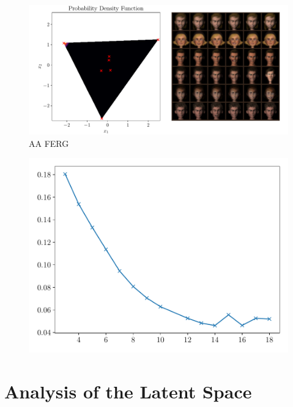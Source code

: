 \begin{figure}[htpb]
    \centering
    \includegraphics[width=1\linewidth]{figures/samples/aa_ferg3.pdf}
    \caption{AA FERG}%
    \label{fig:aa_ferg}
\end{figure}

\begin{figure}[htpb]
    \centering
    \includegraphics[width=0.8\linewidth]{figures/samples/emnist_aa_mse_na.pdf}
    \caption{}%
    \label{fig:emnist_aa_mse}
\end{figure}


\section{Analysis of the Latent Space}%
\label{sec:analysis_of_the_latent_space}

